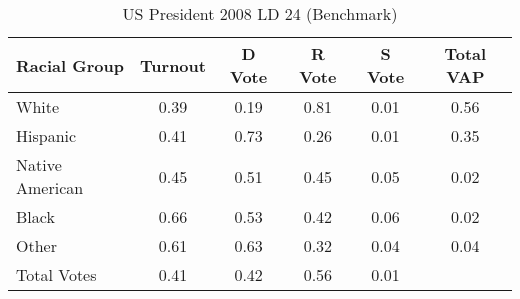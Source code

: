 \begin{table}[htb]
\begin{center}
\caption{US President 2008 LD 24 (Benchmark)}
\label{pres08_vap_ld_24_benchmark}
\begin{tabular}{lccccc}
  \hline
Racial Group & Turnout & D Vote & R Vote & S Vote & Total VAP \\ 
  \hline
White & 0.39 & 0.19 & 0.81 & 0.01 & 0.56 \\ 
  Hispanic & 0.41 & 0.73 & 0.26 & 0.01 & 0.35 \\ 
  Native American & 0.45 & 0.51 & 0.45 & 0.05 & 0.02 \\ 
  Black & 0.66 & 0.53 & 0.42 & 0.06 & 0.02 \\ 
  Other & 0.61 & 0.63 & 0.32 & 0.04 & 0.04 \\ 
  Total Votes & 0.41 & 0.42 & 0.56 & 0.01 &  \\ 
   \hline
\end{tabular}
\end{center}
\end{table}
